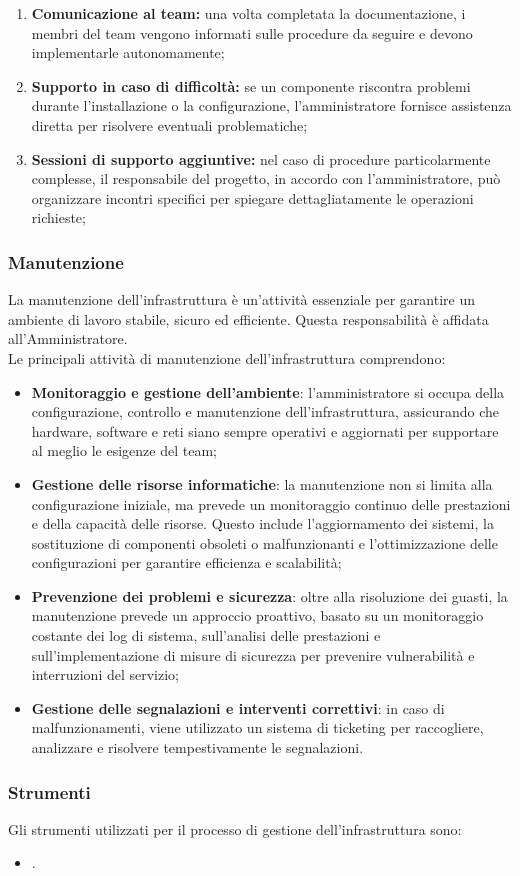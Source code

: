 \begin{enumerate}
    \item \textbf{Comunicazione al team:} una volta completata la documentazione, i membri del team vengono informati sulle procedure da seguire e devono implementarle autonomamente;
    \item \textbf{Supporto in caso di difficoltà:} se un componente riscontra problemi durante l'installazione o la configurazione, l’amministratore fornisce assistenza diretta per risolvere eventuali problematiche;
    \item \textbf{Sessioni di supporto aggiuntive:} nel caso di procedure particolarmente complesse, il responsabile del progetto, in accordo con l’amministratore, può organizzare incontri specifici per spiegare dettagliatamente le operazioni richieste;
\end{enumerate}

\subsubsection{Manutenzione}
La manutenzione dell’infrastruttura è un’attività essenziale per garantire un ambiente di lavoro stabile, sicuro ed efficiente. Questa responsabilità è affidata all’Amministratore. \\
Le principali attività di manutenzione dell'infrastruttura comprendono:
\begin{itemize}
    \item \textbf{Monitoraggio e gestione dell’ambiente}: l'amministratore si occupa della configurazione, controllo e manutenzione dell’infrastruttura, assicurando che hardware, software e reti siano sempre operativi e aggiornati per supportare al meglio le esigenze del team;
    \item \textbf{Gestione delle risorse informatiche}: la manutenzione non si limita alla configurazione iniziale, ma prevede un monitoraggio continuo delle prestazioni e della capacità delle risorse. Questo include l'aggiornamento dei sistemi, la sostituzione di componenti obsoleti o malfunzionanti e l’ottimizzazione delle configurazioni per garantire efficienza e scalabilità;
    \item \textbf{Prevenzione dei problemi e sicurezza}: oltre alla risoluzione dei guasti, la manutenzione prevede un approccio proattivo, basato su un monitoraggio costante dei log di sistema, sull’analisi delle prestazioni e sull’implementazione di misure di sicurezza per prevenire vulnerabilità e interruzioni del servizio;
    \item \textbf{Gestione delle segnalazioni e interventi correttivi}: in caso di malfunzionamenti, viene utilizzato un sistema di ticketing per raccogliere, analizzare e risolvere tempestivamente le segnalazioni.
\end{itemize}

\subsubsection{Strumenti}
Gli strumenti utilizzati per il processo di gestione dell'infrastruttura sono:
\begin{itemize}
    \item {}.
\end{itemize}